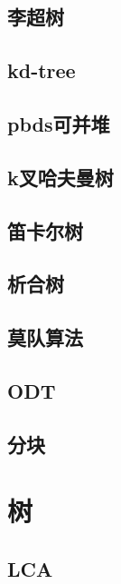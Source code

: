 ﻿\documentclass[a4paper,twocolumn]{article}
\begin{document}
\subsection{李超树}

\subsection{kd-tree}

\subsection{pbds可并堆}

\subsection{k叉哈夫曼树}
\begin{spacing}{1.5}

\end{spacing}

\subsection{笛卡尔树}
\begin{spacing}{1.5}

\end{spacing}

\subsection{析合树}
\begin{spacing}{1.5}

\end{spacing}

\subsection{莫队算法}

\subsection{ODT}

\subsection{分块}

\section{树}
\subsection{LCA}
\end{document}
